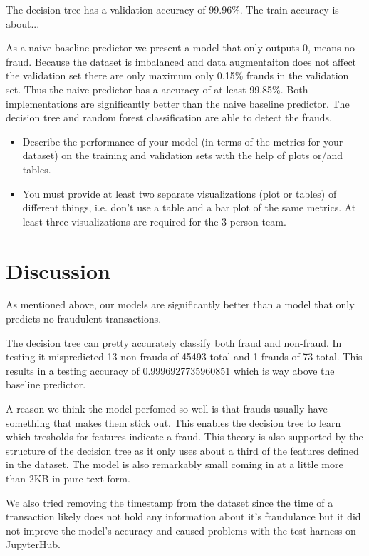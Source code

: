 \documentclass[a4paper, 10pt, conference]{ieeeconf}      %
\begin{document}
The decision tree has a validation accuracy of 99.96\%. The train accuracy is about... %

As a naive baseline predictor we present a model that only outputs 0, means no fraud. 
Because the dataset is imbalanced and data augmentaiton does not affect the validation set there are only maximum only 0.15\% frauds in the validation set. 
Thus the naive predictor has a accuracy of at least 99.85\%. 
Both implementations are significantly better than the naive baseline predictor. The decision tree and random forest classification are able to detect the frauds. 



{\color{blue}

\begin{itemize}
	\item Describe the performance of your model (in terms of the metrics for your dataset) on the training and validation sets with the help of plots or/and tables.
	\item You must provide at least two separate visualizations
          (plot or tables) of different things, i.e. don’t use a table
          and a bar plot of the same metrics. At least three
           visualizations are required for the 3 person team.
\end{itemize}
}

\section{Discussion}
\label{sec:discuss}
As mentioned above, our models are significantly better than a model that only predicts no fraudulent transactions.

The decision tree can pretty accurately classify both fraud and non-fraud. 
In testing it mispredicted 13 non-frauds of 45493 total and 1 frauds of 73 total.
This results in a testing accuracy of 0.9996927735960851 which is way above the baseline predictor.

A reason we think the model perfomed so well is that frauds usually have something that makes them stick out. 
This enables the decision tree to learn which tresholds for features indicate a fraud. 
This theory is also supported by the structure of the decision tree as it only uses about a third of the features defined in the dataset.
The model is also remarkably small coming in at a little more than 2KB in pure text form.

We also tried removing the timestamp from the dataset since the time of a transaction likely does not hold any information about it's fraudulance but it did not improve the model's accuracy and caused problems with the test harness on JupyterHub.
\end{document}
